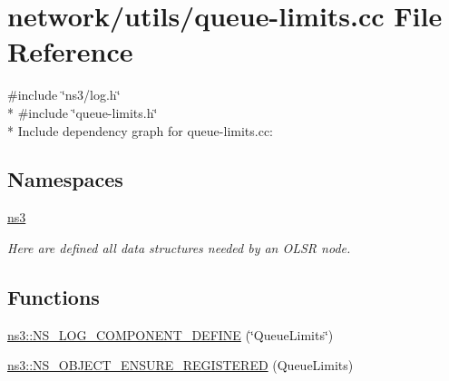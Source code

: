 \hypertarget{queue-limits_8cc}{}\section{network/utils/queue-\/limits.cc File Reference}
\label{queue-limits_8cc}
{\ttfamily \#include \char`\"{}ns3/log.\+h\char`\"{}}\\*
{\ttfamily \#include \char`\"{}queue-\/limits.\+h\char`\"{}}\\*
Include dependency graph for queue-\/limits.cc\+:
\subsection*{Namespaces}
\begin{DoxyCompactItemize}
\item 
 \hyperlink{namespacens3}{ns3}
\begin{DoxyCompactList}\small\item\em Here are defined all data structures needed by an O\+L\+SR node. \end{DoxyCompactList}\end{DoxyCompactItemize}
\subsection*{Functions}
\begin{DoxyCompactItemize}
\item 
\hyperlink{namespacens3_a14d965cc3ccf2f29a5673d8e873fe118}{ns3\+::\+N\+S\+\_\+\+L\+O\+G\+\_\+\+C\+O\+M\+P\+O\+N\+E\+N\+T\+\_\+\+D\+E\+F\+I\+NE} (\char`\"{}Queue\+Limits\char`\"{})
\item 
\hyperlink{namespacens3_a82e2e93ec3b03ee120d4aa1a2936da31}{ns3\+::\+N\+S\+\_\+\+O\+B\+J\+E\+C\+T\+\_\+\+E\+N\+S\+U\+R\+E\+\_\+\+R\+E\+G\+I\+S\+T\+E\+R\+ED} (Queue\+Limits)
\end{DoxyCompactItemize}
